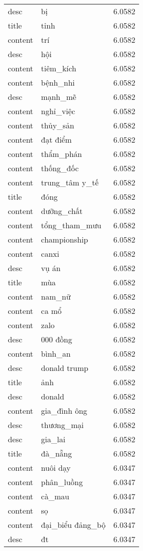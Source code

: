 \documentclass{article}
\begin{document}
\begin{tabular}{lll}
desc & bị & 6.0582\\
title & tỉnh & 6.0582\\
content & trí & 6.0582\\
desc & hội & 6.0582\\
content & tiêm\_kích & 6.0582\\
content & bệnh\_nhi & 6.0582\\
desc & mạnh\_mẽ & 6.0582\\
content & nghỉ\_việc & 6.0582\\
content & thủy\_sản & 6.0582\\
content & đạt điểm & 6.0582\\
content & thẩm\_phán & 6.0582\\
content & thống\_đốc & 6.0582\\
content & trung\_tâm y\_tế & 6.0582\\
title & đóng & 6.0582\\
content & dưỡng\_chất & 6.0582\\
content & tổng\_tham\_mưu & 6.0582\\
content & championship & 6.0582\\
content & canxi & 6.0582\\
desc & vụ án & 6.0582\\
title & mùa & 6.0582\\
content & nam\_nữ & 6.0582\\
content & ca mổ & 6.0582\\
content & zalo & 6.0582\\
desc & 000 đồng & 6.0582\\
content & bình\_an & 6.0582\\
desc & donald trump & 6.0582\\
title & ảnh & 6.0582\\
desc & donald & 6.0582\\
content & gia\_đình ông & 6.0582\\
desc & thương\_mại & 6.0582\\
desc & gia\_lai & 6.0582\\
title & đà\_nẵng & 6.0582\\
content & nuôi dạy & 6.0347\\
content & phân\_luồng & 6.0347\\
content & cà\_mau & 6.0347\\
content & sọ & 6.0347\\
content & đại\_biểu đảng\_bộ & 6.0347\\
desc & đt & 6.0347\\

\end{tabular}
\end{document}
